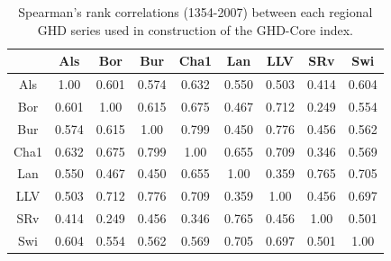 \documentclass[12pt]{article}
\begin{document}
\begin{table}
\small
\caption{\small Spearman's rank correlations (1354-2007) between each regional GHD series used in construction of the GHD-Core index.}
\centering
\begin{tabular}{c c c c c c c c c}
\hline
& Als & Bor & Bur & Cha1 & Lan & LLV & SRv & Swi \\
\hline
Als &1.00 & 0.601 & 0.574 & 0.632 & 0.550 & 0.503 & 0.414 & 0.604\\
Bor & 0.601 & 1.00 & 0.615 & 0.675 & 0.467 & 0.712 & 0.249 & 0.554\\
Bur & 0.574 & 0.615 & 1.00 & 0.799 & 0.450 & 0.776 & 0.456 & 0.562\\
Cha1 & 0.632 & 0.675 & 0.799 & 1.00 & 0.655 & 0.709 & 0.346 & 0.569\\
Lan & 0.550 & 0.467 & 0.450 & 0.655 & 1.00 & 0.359 & 0.765 & 0.705\\
LLV & 0.503 & 0.712 & 0.776 & 0.709 & 0.359 & 1.00 & 0.456 & 0.697\\
SRv & 0.414 & 0.249 & 0.456 & 0.346 & 0.765 & 0.456 & 1.00 & 0.501\\
Swi & 0.604 & 0.554 & 0.562 & 0.569 & 0.705 & 0.697 & 0.501 & 1.00\\
\hline
\end{tabular}
\end{table}
\end{document}
